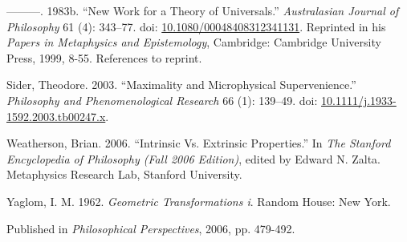 \documentclass[
  10pt,
  letterpaper,
  DIV=11,
  numbers=noendperiod,
  twoside]{scrartcl}
\newlength{\cslhangindent}
\newenvironment{CSLReferences}[2] %
 {\begin{list}{}{%
  \setlength{\itemindent}{0pt}
  \setlength{\leftmargin}{0pt}
  \setlength{\parsep}{0pt}
  \ifodd #1
   \setlength{\leftmargin}{\cslhangindent}
   \setlength{\itemindent}{-1\cslhangindent}
  \fi
  \setlength{\itemsep}{#2\baselineskip}}}
 {\end{list}}
\begin{document}
\begin{CSLReferences}{1}{0}
---------. 1983b. {``New Work for a Theory of Universals.''}
\emph{Australasian Journal of Philosophy} 61 (4): 343--77. doi:
\href{https://doi.org/10.1080/00048408312341131}{10.1080/00048408312341131}.
Reprinted in his \emph{Papers in Metaphysics and Epistemology},
Cambridge: Cambridge University Press, 1999, 8-55. References to
reprint.

Sider, Theodore. 2003. {``Maximality and Microphysical Supervenience.''}
\emph{Philosophy and Phenomenological Research} 66 (1): 139--49. doi:
\href{https://doi.org/10.1111/j.1933-1592.2003.tb00247.x}{10.1111/j.1933-1592.2003.tb00247.x}.

Weatherson, Brian. 2006. {``{Intrinsic Vs. Extrinsic Properties}.''} In
\emph{The Stanford Encyclopedia of Philosophy (Fall 2006 Edition)},
edited by Edward N. Zalta. Metaphysics Research Lab, Stanford
University.

Yaglom, I. M. 1962. \emph{Geometric Transformations i}. Random House:
New York.

\end{CSLReferences}



\noindent Published in\emph{
Philosophical Perspectives}, 2006, pp. 479-492.
\end{document}
